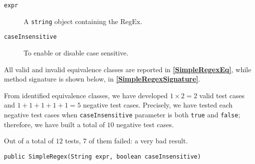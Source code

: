 \documentclass[sigconf]{acmart}
\begin{document}
\begin{description}
\item[\texttt{expr}] A \texttt{string} object containing the RegEx.
\item[\texttt{caseInsensitive}] To enable or disable case sensitive. 
\end{description}

All valid and invalid equivalence classes are reported in \textbf{\cref{SimpleRegexEq}}, while method signature is shown below, in \textbf{\cref{SimpleRegexSignature}}.

From identified equivalence classes, we have developed $1 \times 2 = 2$ valid test cases and $1+1+1+1+1=5$ negative test cases. Precisely, we have tested each negative test cases when \texttt{caseInsensitive} parameter is both \texttt{true} and \texttt{false}; therefore, we have built a total of $10$ negative test cases.

Out of a total of $12$ tests, $7$ of them failed: a very bad result.

\begin{lstlisting}[frame=lines,basicstyle=\ttfamily\tiny, caption={Signature of method \texttt{SimpleRegex}}, label={SimpleRegexSignature}]
public SimpleRegex(String expr, boolean caseInsensitive)
\end{lstlisting}
\end{document}
